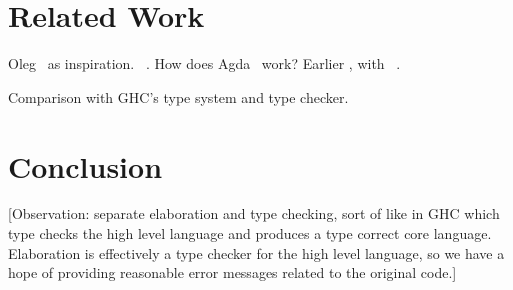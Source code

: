 \section{Related Work}

Oleg~\cite{McBride1999} as inspiration. \Epigram{}~\cite{McBride2004a}.
How does Agda~\cite{norell2007thesis} work?
Earlier \Idris{}, with \Ivor{}~\cite{Brady2006b}.

Comparison with GHC's type system and type checker.

\section{Conclusion}

[Observation: separate elaboration and type checking, sort of like in GHC which
type checks the high level language and produces a type correct core language.
Elaboration is effectively a type checker for the high level language, so we have
a hope of providing reasonable error messages related to the original code.]
